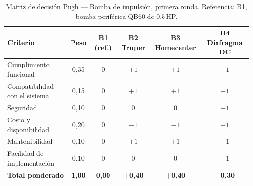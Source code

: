\begin{table}[H]
\centering
\caption{Matriz de decisión Pugh --- Bomba de impulsión, primera ronda. Referencia: B1, bomba periférica QB60 de 0,5\,HP.}
\label{tab:pugh-bomba-r1}
\begin{tabularx}{\textwidth}{Xccccc}
\toprule
\textbf{Criterio} & \textbf{Peso} & \textbf{B1 (ref.)} & \textbf{B2 Truper} & \textbf{B3 Homecenter} & \textbf{B4 Diafragma DC} \\
\midrule
Cumplimiento funcional        & 0,35 & 0 & $+1$ & $+1$ & $-1$ \\
Compatibilidad con el sistema & 0,15 & 0 & $+1$ & $+1$ & $+1$ \\
Seguridad                     & 0,10 & 0 & 0    & 0    & $+1$ \\
Costo y disponibilidad        & 0,20 & 0 & $-1$ & $-1$ & $-1$ \\
Mantenibilidad                & 0,10 & 0 & $+1$ & $+1$ & $-1$ \\
Facilidad de implementación   & 0,10 & 0 & 0    & 0    & $+1$ \\
\midrule
\textbf{Total ponderado}      & \textbf{1,00} & \textbf{0,00} & \textbf{+0,40} & \textbf{+0,40} & \textbf{$-$0,30} \\
\bottomrule
\end{tabularx}
\end{table}
